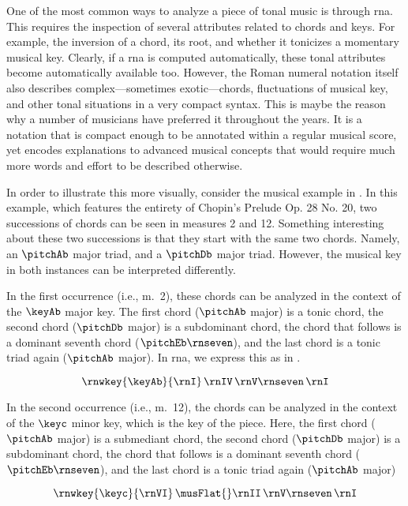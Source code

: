 
One of the most common ways to analyze a piece of tonal
music is through \gls{rna}. This requires the inspection of
several attributes related to chords and keys. For example,
the inversion of a chord, its root, and whether it tonicizes
a momentary musical key. Clearly, if a \gls{rna} is computed
automatically, these tonal attributes become automatically
available too. However, the Roman numeral notation itself
also describes complex---sometimes exotic---chords,
fluctuations of musical key, and other tonal situations in a
very compact syntax. This is maybe the reason why a number
of musicians have preferred it throughout the years. It is a
notation that is compact enough to be annotated within a
regular musical score, yet encodes explanations to advanced
musical concepts that would require much more words and
effort to be described otherwise.

In order to illustrate this more visually, consider the
musical example in . In this
example, which features the entirety of Chopin's Prelude Op.
28 No. 20, two successions of chords can be seen in measures
2 and 12. Something interesting about these two successions
is that they start with the same two chords. Namely, an
$\pitchAb$ major triad, and a $\pitchDb$ major triad.
However, the musical key in both instances can be
interpreted differently. 

In the first occurrence (i.e., m.~2), these chords can be
analyzed in the context of the $\keyAb$ major key. The first
chord ($\pitchAb$ major) is a tonic chord, the second chord
($\pitchDb$ major) is a subdominant chord, the chord that
follows is a dominant seventh chord ($\pitchEb\rnseven$),
and the last chord is a tonic triad again ($\pitchAb$
major). In \gls{rna}, we express this as in
.

\begin{equation}
    \label{eq:succession1}
    \rnwkey{\keyAb}{\rnI} \, \rnIV \, \rnV\rnseven \, \rnI
\end{equation}

In the second occurrence (i.e., m.~12), the chords can be
analyzed in the context of the $\keyc$ minor key, which is
the key of the piece. Here, the first chord ($\pitchAb$
major) is a submediant chord, the second chord ($\pitchDb$
major) is a subdominant chord, the chord that follows is a
dominant seventh chord ($\pitchEb\rnseven$), and the last
chord is a tonic triad again ($\pitchAb$ major)

\begin{equation}
    \label{eq:succession2}
    \rnwkey{\keyc}{\rnVI} \, \musFlat{}\rnII \, \rnV\rnseven \, \rnI
\end{equation}


